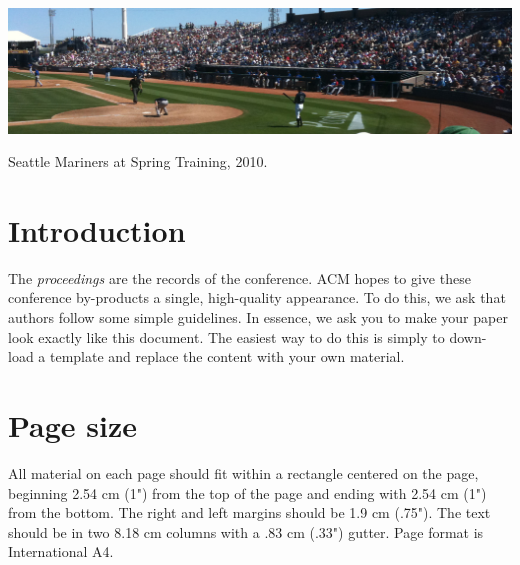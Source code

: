 \documentclass[acmtog, authorversion]{acmart}
\begin{document}



\begin{teaserfigure}
  \includegraphics[width=\textwidth]{sampleteaser}
  \caption{Seattle Mariners at Spring Training, 2010.}
  \label{fig:teaser}
\end{teaserfigure}

\maketitle

\section{Introduction}
The \textit{proceedings} are the records of the conference. ACM 
hopes to give these conference by-products a single, high-quality
appearance. To do this, we ask that authors follow some simple 
guidelines. In essence, we ask you to make your paper look exactly 
like this document. The easiest way to do this is simply to down-load 
a template and replace the content with your own material.

\section{Page size}
All material on each page should fit within a rectangle centered on 
the page, beginning 2.54 cm (1") from the top of the page and ending 
with 2.54 cm (1") from the bottom.  The right and left margins should be 
1.9 cm (.75").  The text should be in two 8.18 cm columns with a .83 cm 
(.33") gutter. Page format is International A4.
\end{document}
